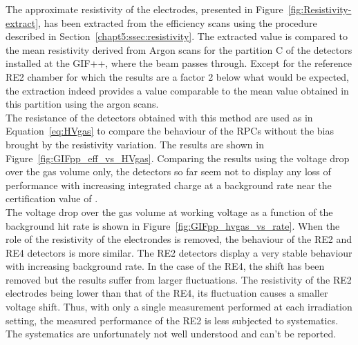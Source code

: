 	The approximate resistivity of the electrodes, presented in Figure~\ref{fig:Resistivity-extract}, has been extracted from the efficiency scans using the procedure described in Section~\ref{chapt5:ssec:resistivity}. The extracted value is compared to the mean resistivity derived from Argon scans for the partition C of the detectors installed at the GIF++, where the beam passes through. Except for the reference RE2 chamber for which the results are a factor 2 below what would be expected, the extraction indeed provides a value comparable to the mean value obtained in this partition using the argon scans.\\
	The resistance of the detectors obtained with this method are used as in Equation~\ref{eq:HVgas} to compare the behaviour of the RPCs without the bias brought by the resistivity variation. The results are shown in Figure~\ref{fig:GIFpp_eff_vs_HVgas}. Comparing the results using the voltage drop over the gas volume only, the detectors so far seem not to display any loss of performance with increasing integrated charge at a background rate near the certification value of .\\
	The voltage drop over the gas volume at working voltage as a function of the background hit rate is shown in Figure~\ref{fig:GIFpp_hvgas_vs_rate}. When the role of the resistivity of the electrondes is removed, the behaviour of the RE2 and RE4 detectors is more similar. The RE2 detectors display a very stable behaviour with increasing background rate. In the case of the RE4, the shift has been removed but the results suffer from larger fluctuations. The resistivity of the RE2 electrodes being lower than that of the RE4, its fluctuation causes a smaller voltage shift. Thus, with only a single measurement performed at each irradiation setting, the measured performance of the RE2 is less subjected to systematics. The systematics are unfortunately not well understood and can't be reported.
	
